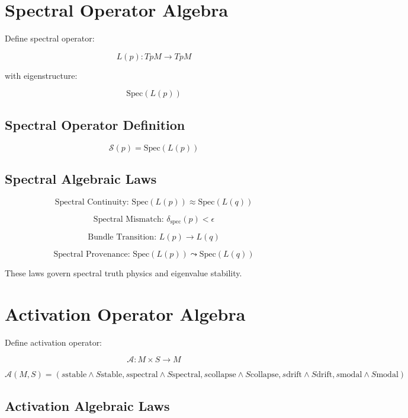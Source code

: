 \documentclass[11pt]{article}
\begin{document}
\section{Spectral Operator Algebra}

Define spectral operator:

\[
L(p) : TpM \to TpM
\]

with eigenstructure:

\[
\mathrm{Spec}(L(p))
\]

\subsection{Spectral Operator Definition}

\[
\mathcal{S}(p) = \mathrm{Spec}(L(p))
\]

\subsection{Spectral Algebraic Laws}

\[
\text{Spectral Continuity: }
\mathrm{Spec}(L(p)) \approx \mathrm{Spec}(L(q))
\]

\[
\text{Spectral Mismatch: }
\delta_{\mathrm{spec}}(p) < \epsilon
\]

\[
\text{Bundle Transition: }
L(p) \to L(q)
\]

\[
\text{Spectral Provenance: }
\mathrm{Spec}(L(p)) \leadsto \mathrm{Spec}(L(q))
\]

These laws govern spectral truth physics and eigenvalue stability.

\section{Activation Operator Algebra}

Define activation operator:

\[
\mathcal{A} : M \times S \to M
\]

\[
\mathcal{A}(M, S) =
  (s{\text{stable}} \land S{\text{stable}},
   s{\text{spectral}} \land S{\text{spectral}},
   s{\text{collapse}} \land S{\text{collapse}},
   s{\text{drift}} \land S{\text{drift}},
   s{\text{modal}} \land S{\text{modal}})
\]

\subsection{Activation Algebraic Laws}
\end{document}
